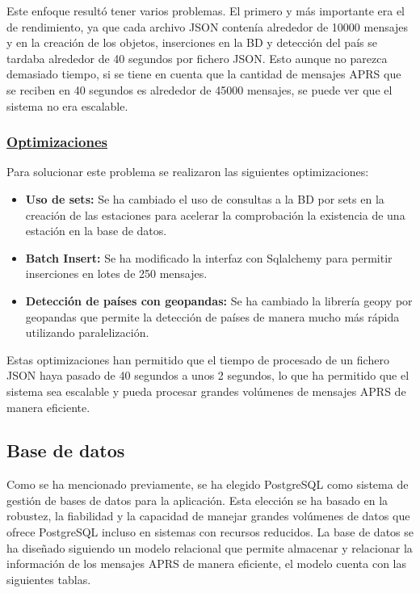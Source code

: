 Este enfoque resultó tener varios problemas. El primero y más importante era el de rendimiento, ya que cada archivo JSON contenía alrededor de 10000 mensajes y en la creación de los objetos, inserciones en la BD y detección del país se tardaba alrededor de 40 segundos por fichero JSON. Esto aunque no parezca demasiado tiempo, si se tiene en cuenta que la cantidad de mensajes APRS que se reciben en 40 segundos es alrededor de 45000 mensajes, se puede ver que el sistema no era escalable.

\subsubsection*{\underline{Optimizaciones}}
Para solucionar este problema se realizaron las siguientes optimizaciones:
\begin{itemize}
	\item \textbf{Uso de sets:} Se ha cambiado el uso de consultas a la BD por sets en la creación de las estaciones para acelerar la comprobación la existencia de una estación en la base de datos.
	\item \textbf{Batch Insert:} Se ha modificado la interfaz con Sqlalchemy para permitir inserciones en lotes de 250 mensajes.
	\item \textbf{Detección de países con geopandas:} Se ha cambiado la librería geopy por geopandas que permite la detección de países de manera mucho más rápida utilizando paralelización.
\end{itemize}
Estas optimizaciones han permitido que el tiempo de procesado de un fichero JSON haya pasado de 40 segundos a unos 2 segundos, lo que ha permitido que el sistema sea escalable y pueda procesar grandes volúmenes de mensajes APRS de manera eficiente.

\subsection*{Base de datos}
Como se ha mencionado previamente, se ha elegido PostgreSQL como sistema de gestión de bases de datos para la aplicación. Esta elección se ha basado en la robustez, la fiabilidad y la capacidad de manejar grandes volúmenes de datos que ofrece PostgreSQL incluso en sistemas con recursos reducidos. La base de datos se ha diseñado siguiendo un modelo relacional  que permite almacenar y relacionar la información de los mensajes APRS de manera eficiente, el modelo cuenta con las siguientes tablas.

